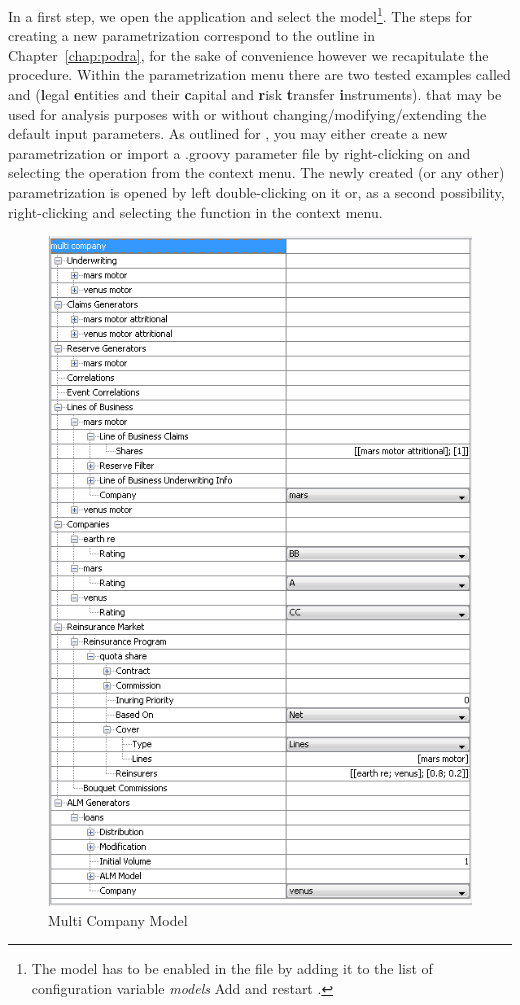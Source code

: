 In a first step, we open the application and select the  model\footnote{The model has to be enabled in the \ConfigGroovy{} file by adding it to the list of configuration variable {\em models} Add  and restart \RA.}. The steps for creating a new parametrization correspond to the outline in Chapter~\ref{chap:podra}, for the sake of convenience however we recapitulate the procedure.
 Within the parametrization menu there are two tested examples called  and  (\textbf{l}egal \textbf{e}ntities and their \textbf{c}apital and \textbf{r}isk \textbf{t}ransfer \textbf{i}nstruments). that may be used for analysis purposes with or without changing/modifying/extending the default input parameters. As outlined for \PODRA{}, you may either create a new parametrization or import a .groovy parameter file by right-clicking on  and selecting the operation from the context menu.
The newly created (or any other) parametrization is opened by left double-clicking on it or, as a second possibility, right-clicking and selecting the  function in the context menu.
\begin{figure}[htb]
	\centering
		\includegraphics[scale=0.7]{images/multiCompanyEx.png}
	\caption{Multi Company Model}
	\label{fig:multiCompany}
\end{figure}

